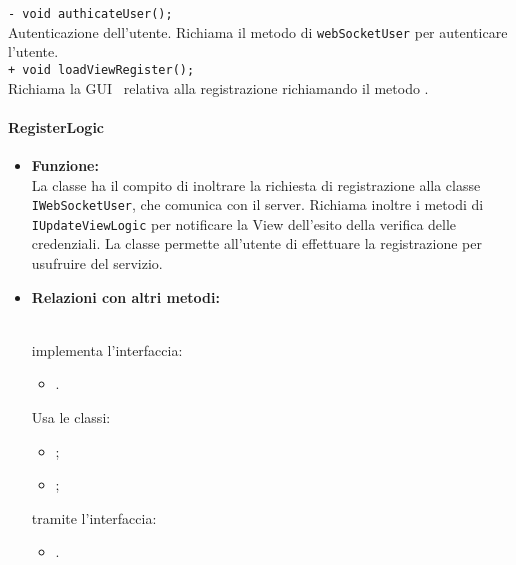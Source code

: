 {{\begin{sloppypar}
{{{\begin{itemize}
					\texttt{- void authicateUser();}\\
					Autenticazione dell'utente. Richiama il metodo di \texttt{webSocketUser} per autenticare l'utente.\\
					
					\texttt{+ void loadViewRegister();}\\
					Richiama la GUI\g~ relativa alla registrazione richiamando il metodo .\\
			\end{itemize}
			}

		

			\paragraph{RegisterLogic}\label{par:RegisterLogic}{
			\begin{itemize}
			
				\item[] \textbf{Funzione:}\\
					La classe ha il compito di inoltrare la richiesta di registrazione alla classe \texttt{IWebSocketUser}, che comunica con il server\g. Richiama inoltre i metodi di \texttt{IUpdateViewLogic} per notificare la View dell'esito della verifica delle credenziali. La classe permette all'utente di effettuare la registrazione per usufruire del servizio.\\
			
				\item[] \textbf{Relazioni con altri metodi:}{\\
				implementa l'interfaccia:
				\begin{itemize}
					\item[] .
				\end{itemize}
				Usa le classi:
				\begin{itemize}
				 	\item[] ;
				 	\item[] ;
				 \end{itemize}
				 tramite l'interfaccia: 
				 \begin{itemize}
				 	\item[].\\
				\end{itemize}
				}
				

\end{itemize}}}}
\end{sloppypar}}}
